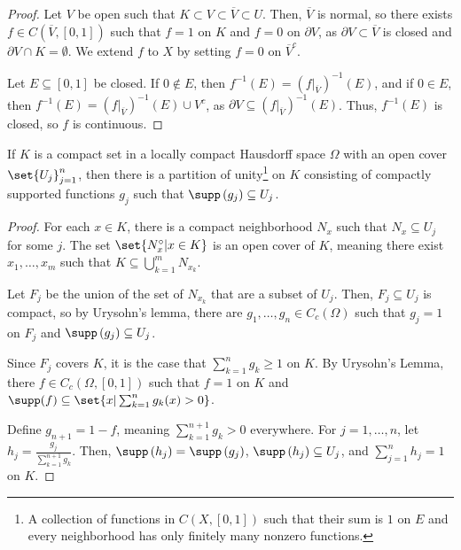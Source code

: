 \documentclass[10pt]{mypackage}
\begin{document}
\begin{proof}
  Let $V$ be open such that $K\subset V\subset \overline{V}\subset U$. Then, $\overline{V}$ is normal, so there exists $f\in C\left(\overline{V},[0,1]\right)$ such that $f = 1$ on $K$ and $f = 0$ on $\partial V$, as $\partial V \subset \overline{V}$ is closed and $\partial V \cap K = \emptyset$. We extend $f$ to $X$ by setting $f = 0$ on $\overline{V}^{c}$.\newline

  Let $E\subseteq [0,1]$ be closed. If $0\notin E$, then $f^{-1}\left(E\right) = \left(f|_{\overline{V}}\right)^{-1}\left(E\right)$, and if $0\in E$, then $f^{-1}\left(E\right) = \left(f|_{\overline{V}}\right)^{-1}\left(E\right) \cup V^c$, as $\partial V\subseteq \left(f|_{\overline{V}}\right)^{-1}\left(E\right)$. Thus, $f^{-1}\left(E\right)$ is closed, so $f$ is continuous.
\end{proof}
\begin{proposition}
    If $K$ is a compact set in a locally compact Hausdorff space $\Omega$ with an open cover $\set{U_j}_{j=1}^{n}$, then there is a partition of unity\footnote{A collection of functions in $C\left(X,[0,1]\right)$ such that their sum is $1$ on $E$ and every neighborhood has only finitely many nonzero functions.} on $K$ consisting of compactly supported functions $g_j$ such that $\supp\left(g_j\right)\subseteq U_j$.
\end{proposition}
\begin{proof}
  For each $x\in K$, there is a compact neighborhood $N_x$ such that $N_x\subseteq U_j$ for some $j$. The set $\set{N_x^{\circ}| x\in K}$ is an open cover of $K$, meaning there exist $x_1,\dots,x_m$ such that $K\subseteq \bigcup_{k=1}^{m}N_{x_k}$.\newline

  Let $F_j$ be the union of the set of $N_{x_k}$ that are a subset of $U_j$. Then, $F_j\subseteq U_j$ is compact, so by Urysohn's lemma, there are $g_1,\dots,g_n\in C_c\left(\Omega\right)$ such that $g_j = 1$ on $F_j$ and $\supp\left(g_j\right) \subseteq U_j$.\newline

  Since $F_j$ covers $K$, it is the case that $\sum_{k=1}^{n}g_k \geq 1$ on $K$. By Urysohn's Lemma, there $f\in C_c\left(\Omega,[0,1]\right)$ such that $f = 1$ on $K$ and $\supp(f) \subseteq \set{x| \sum_{k=1}^{n}g_k(x) > 0}$.\newline

  Define $g_{n+1} = 1 - f$, meaning $\sum_{k=1}^{n+1}g_{k} > 0$ everywhere. For $j = 1,\dots,n$, let $h_j = \frac{g_j}{\sum_{k=1}^{n+1}g_k}$. Then, $\supp\left(h_j\right) = \supp\left(g_j\right)$, $\supp\left(h_j\right) \subseteq U_j$, and $\sum_{j=1}^{n}h_j = 1$ on $K$.
\end{proof}
\end{document}

